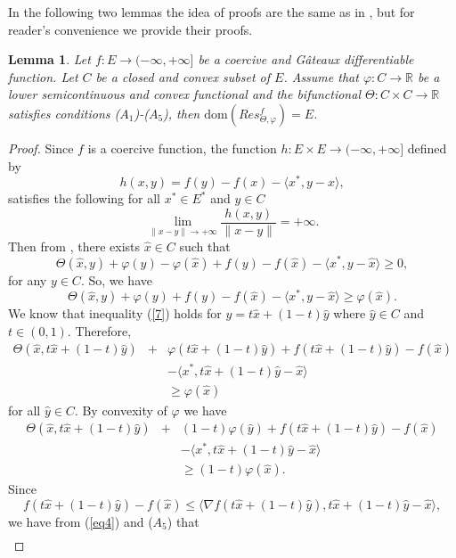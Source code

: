 \documentclass[reqno,b5paper]{amsart}
\theoremstyle{plain}
\newtheorem{lemma}[theorem]{Lemma}
\theoremstyle{definition}
\numberwithin{equation}{section}
\numberwithin{equation}{section}
\begin{document}
In the following two lemmas the idea of proofs are the same as in \cite{rei}, but for reader's convenience we provide their proofs.
\begin{lemma}
Let $f:E\to(-\infty,+\infty]$ be a coercive and G\^{a}teaux differentiable function. Let $C$ be a closed and convex subset of $E$. Assume that $\varphi:C\to\mathbb{R}$ be a lower semicontinuous and convex functional and the bifunctional $\Theta:C\times C\to\mathbb{R}$ satisfies conditions ($A_{1}$)-($A_{5}$), then $\text{dom}(Res_{\Theta,\varphi}^{f})=E$.
\end{lemma}
\begin{proof}
Since $f$ is a coercive function, the function $h:E\times E\to (-\infty,+\infty]$ defined by
$$h(x,y)=f(y)-f(x)-\langle x^{*},y-x\rangle,$$
satisfies the following for all $x^{*}\in E^{*}$ and $y\in C$ 
$$\lim_{\|x-y\|\to+\infty}\frac{h(x,y)}{\|x-y\|}=+\infty.$$
Then from \cite[Theorem 1]{blu}, there exists $\hat{x}\in C$ such that
\begin{equation*}
\Theta(\hat{x},y)+\varphi(y)-\varphi(\hat{x})+f(y)-f(\hat{x})-\langle x^{*},y-\hat{x}\rangle\geq0,
\end{equation*}
for any $y\in C$. So, we have
\begin{equation}\label{7}
\Theta(\hat{x},y)+\varphi(y)+f(y)-f(\hat{x})-\langle x^{*},y-\hat{x}\rangle\geq\varphi(\hat{x}).
\end{equation}
We know that inequality (\ref{7}) holds for $y=t\hat{x}+(1-t)\hat{y}$ where $\hat{y}\in C$ and $t\in (0,1)$. Therefore,
\begin{eqnarray*}
\Theta(\hat{x},t\hat{x}+(1-t)\hat{y})&+&\varphi(t\hat{x}+(1-t)\hat{y})+f(t\hat{x}+(1-t)\hat{y})-f(\hat{x})\\
&&-\langle x^{*},t\hat{x}+(1-t)\hat{y}-\hat{x}\rangle\\
&&\geq\varphi(\hat{x})
\end{eqnarray*}
for all $\hat{y}\in C$. By convexity of $\varphi$ we have
\begin{eqnarray}
\Theta(\hat{x},t\hat{x}+(1-t)\hat{y})&+&(1-t)\varphi(\hat{y})+f(t\hat{x}+(1-t)\hat{y})-f(\hat{x})\nonumber\\
&&-\langle x^{*},t\hat{x}+(1-t)\hat{y}-\hat{x}\rangle\nonumber\\
&&\geq(1-t)\varphi(\hat{x}).\label{eq4}
\end{eqnarray}
Since 
$$f(t\hat{x}+(1-t)\hat{y})-f(\hat{x})\leq \langle \nabla f(t\hat{x}+(1-t)\hat{y}),t\hat{x}+(1-t)\hat{y}-\hat{x}\rangle,$$
we have from (\ref{eq4}) and ($A_{5}$) that
\begin{eqnarray*}

\end{eqnarray*}
\end{proof}
\end{document}
